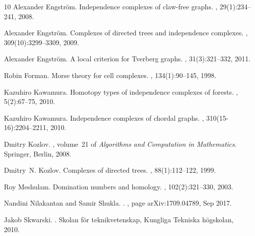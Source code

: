 \documentclass[12pt]{article}
\numberwithin{thm}{section}
\theoremstyle{definition}
\begin{document}
\begin{thebibliography}{10}
	Alexander Engstr\"{o}m.
	\newblock Independence complexes of claw-free graphs.
	, 29(1):234--241, 2008.
	
	Alexander Engstr\"{o}m.
	\newblock Complexes of directed trees and independence complexes.
	, 309(10):3299--3309, 2009.
	
	Alexander Engstr\"{o}m.
	\newblock A local criterion for {T}verberg graphs.
	, 31(3):321--332, 2011.
	
	Robin Forman.
	\newblock Morse theory for cell complexes.
	, 134(1):90--145, 1998.
	
	Kazuhiro Kawamura.
	\newblock Homotopy types of independence complexes of forests.
	, 5(2):67--75, 2010.
	
	Kazuhiro Kawamura.
	\newblock Independence complexes of chordal graphs.
	, 310(15-16):2204--2211, 2010.
	
	Dmitry Kozlov.
	, volume~21 of {\em Algorithms
		and Computation in Mathematics}.
	\newblock Springer, Berlin, 2008.
	
	Dmitry~N. Kozlov.
	\newblock Complexes of directed trees.
	, 88(1):112--122, 1999.
	
	Roy Meshulam.
	\newblock Domination numbers and homology.
	, 102(2):321--330, 2003.
	
	Nandini {Nilakantan} and Samir {Shukla}.
	.
	, page arXiv:1709.04789, Sep 2017.
	
	Jakob Skwarski.
	.
	\newblock Skolan f{\"o}r teknikvetenskap, Kungliga Tekniska h{\"o}gskolan,
	2010.
	
\end{thebibliography}

\end{document}
